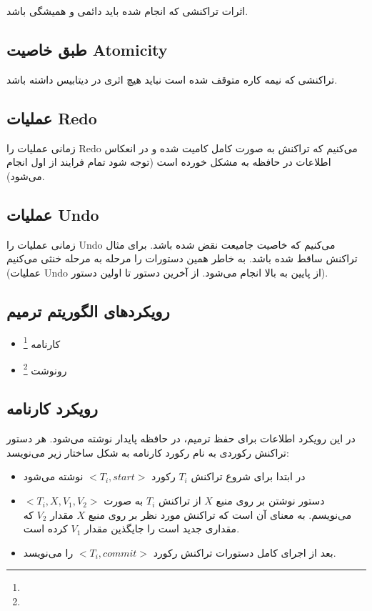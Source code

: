 اثرات تراکنشی که انجام شده باید دائمی و همیشگی باشد.

\subsection*{طبق خاصیت Atomicity}

تراکنشی که نیمه کاره متوقف شده است نباید هیچ اثری در دیتابیس داشته باشد.

\subsection{عملیات Redo}

زمانی عملیات را Redo می‌کنیم که تراکنش به صورت کامل کامیت شده و در انعکاس
اطلاعات در حافظه به مشکل خورده است (توجه شود تمام فرایند از اول انجام می‌شود).

\subsection{عملیات Undo}

زمانی عملیات را Undo می‌کنیم که خاصیت جامیعت نقض شده باشد. برای مثال تراکنش ساقط
شده باشد. به خاطر همین دستورات را مرحله به مرحله خنثی می‌کنیم (عملیات Undo از
پایین به بالا انجام می‌شود. از آخرین دستور تا اولین دستور).

\subsection{رویکرد‌های الگوریتم ترمیم}

\begin{itemize}
    \item کارنامه \footnote{}
    \item رونوشت \footnote{}
\end{itemize}

\subsection{رویکرد کارنامه}

در این رویکرد اطلاعات برای حفظ ترمیم، در حافظه پایدار نوشته می‌شود. هر دستور
تراکنش رکوردی به نام رکورد کارنامه به شکل ساختار زیر می‌نویسد:

\begin{itemize}
    \item در ابتدا برای شروع تراکنش $T_i$ رکورد $<T_i, start>$ نوشته می‌شود
    \item دستور نوشتن بر روی منبع $X$ از تراکنش $T_i$ به صورت $<T_i, X, V_1,
    V_2>$ می‌نویسم. به معنای آن است که تراکنش مورد نظر بر روی منبع $X$ مقدار
    $V_2$ که مقداری جدید است را جایگذین مقدار $V_1$ کرده است.
    \item بعد از اجرای کامل دستورات تراکنش رکورد $<T_i, commit>$ را می‌نویسد.
\end{itemize}

